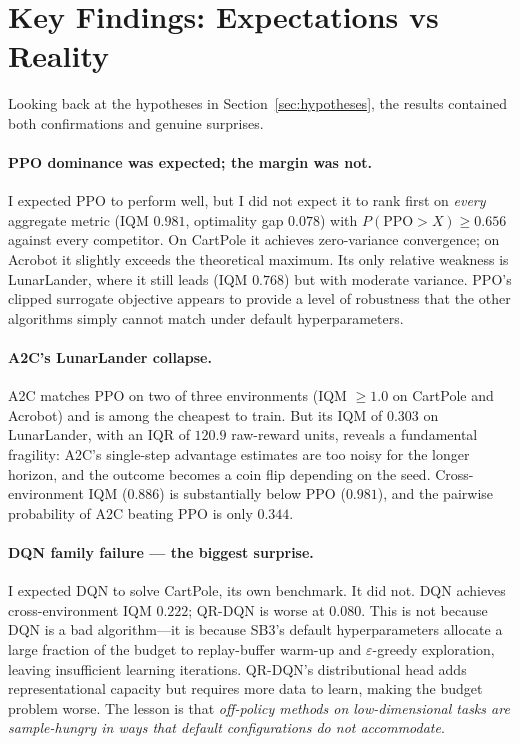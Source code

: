 \section{Key Findings: Expectations vs Reality}
\label{sec:key-findings}

Looking back at the hypotheses in Section~\ref{sec:hypotheses}, the
results contained both confirmations and genuine surprises.

\paragraph{PPO dominance was expected; the margin was not.}
I expected PPO to perform well, but I did not expect it to rank first
on \emph{every} aggregate metric (IQM $0.981$, optimality gap $0.078$)
with $P(\text{PPO} > X) \ge 0.656$ against every competitor. On CartPole
it achieves zero-variance convergence; on Acrobot it slightly exceeds
the theoretical maximum. Its only relative weakness is LunarLander, where
it still leads (IQM $0.768$) but with moderate variance. PPO's clipped
surrogate objective appears to provide a level of robustness that the
other algorithms simply cannot match under default hyperparameters.

\paragraph{A2C's LunarLander collapse.}
A2C matches PPO on two of three environments (IQM $\ge 1.0$ on CartPole
and Acrobot) and is among the cheapest to train. But its IQM of $0.303$
on LunarLander, with an IQR of $120.9$ raw-reward units, reveals a
fundamental fragility: A2C's single-step advantage estimates are too
noisy for the longer horizon, and the outcome becomes a coin flip
depending on the seed. Cross-environment IQM ($0.886$) is substantially
below PPO ($0.981$), and the pairwise probability of A2C beating PPO is
only $0.344$.

\paragraph{DQN family failure --- the biggest surprise.}
I expected DQN to solve CartPole, its own benchmark. It did not.
DQN achieves cross-environment IQM $0.222$; QR-DQN is worse at $0.080$.
This is not because DQN is a bad algorithm---it is because SB3's default
hyperparameters allocate a large fraction of the budget to replay-buffer
warm-up and $\varepsilon$-greedy exploration, leaving insufficient
learning iterations. QR-DQN's distributional head adds representational
capacity but requires more data to learn, making the budget problem
worse. The lesson is that \emph{off-policy methods on low-dimensional
tasks are sample-hungry in ways that default configurations do not
accommodate}.

